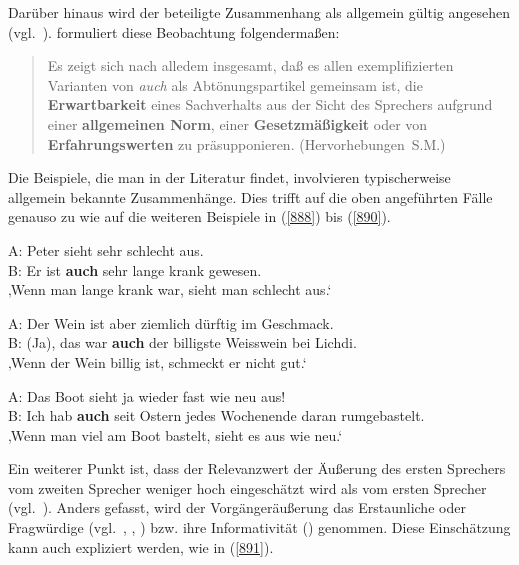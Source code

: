 {Darüber hinaus wird der beteiligte Zusammenhang als allgemein gültig angesehen (vgl.\ \citealt[47]{Dahl1988}). \citet[103]{Burkhardt1982} formuliert diese Beobachtung folgendermaßen: 

\begin{quotation}
Es zeigt sich nach alledem insgesamt, daß es allen exemplifizierten Varianten von \textit{auch} als Abtönungspartikel gemeinsam ist, die \textbf{Erwartbarkeit} eines Sachverhalts aus der Sicht des Sprechers aufgrund einer \textbf{allgemeinen Norm}, einer \textbf{Gesetzmäßigkeit} oder von \textbf{Erfahrungswerten} zu präsupponie\-ren.
\hfill\hbox{(Hervorhebungen S.M.)}
\end{quotation}
Die Beispiele, die man in der Literatur findet, involvieren typischerweise allgemein bekannte Zusammenhänge. Dies trifft auf die oben angeführten Fälle genauso zu wie auf die weiteren Beispiele in (\ref{888}) bis (\ref{890}).

\begin{exe}
	\ex\label{888}
	A: Peter sieht sehr schlecht aus.\\	 
	B: Er ist \textbf{auch} sehr lange krank gewesen.
	\hfill\hbox{\citet[88]{Helbig1990}}\\
	‚Wenn man lange krank war, sieht man schlecht aus.‘
\end{exe}

\begin{exe}
	\ex\label{889}
	A: Der Wein ist aber ziemlich dürftig im Geschmack.\\	 
	B: (Ja), das war \textbf{auch} der billigste Weisswein bei Lichdi.
	\newline
	\hbox{}\hfill\hbox{\citet[211]{Franck1980}}\\
	‚Wenn der Wein billig ist, schmeckt er nicht gut.‘
\end{exe}

\begin{exe}
	\ex\label{890}
	A: Das Boot sieht ja wieder fast wie neu aus!\\	 
	B: Ich hab \textbf{auch} seit Ostern jedes Wochenende daran rumgebastelt.
	\newline
	\hbox{}\hfill\hbox{\citet[211]{Franck1980}}\\
	‚Wenn man viel am Boot bastelt, sieht es aus wie neu.‘
\end{exe}
Ein weiterer Punkt ist, dass der Relevanzwert der Äußerung des ersten Sprechers vom zweiten Sprecher weniger hoch eingeschätzt wird als vom ersten Sprecher (vgl.\ \citealt[47--48]{Dahl1988}). Anders gefasst, wird der Vorgängeräußerung das Erstaunliche oder Fragwürdige (vgl.\ \citealt[211--212]{Franck1980}, \citealt[88]{Helbig1990}, \citealt[74]{Kwon2005}) bzw. ihre Informativität (\citealt[223--224]{Karagjosova2004}) genommen. Diese Einschätzung kann auch expliziert werden, wie in (\ref{891}).

}
